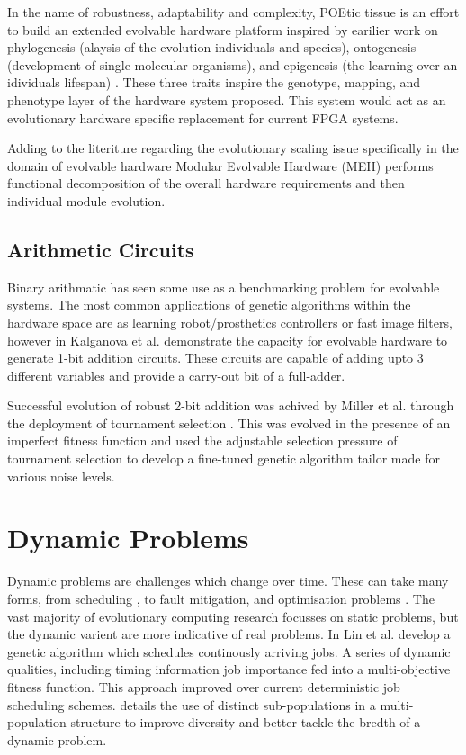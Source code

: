 In the name of robustness, adaptability and complexity, POEtic tissue
\cite{Tyrrell:2003:PTI:1766731.1766747} is
an effort to build an extended evolvable hardware platform inspired by
earilier work on phylogenesis (alaysis of the evolution individuals and species),
ontogenesis (development of single-molecular organisms), and epigenesis
(the learning over an idividuals lifespan) \cite{10.1007/3-540-63173-9_37}.
These three traits inspire the genotype, mapping, and phenotype layer of the
hardware system proposed. This system would act as an evolutionary hardware
specific replacement for current FPGA systems.

Adding to the literiture regarding the evolutionary scaling issue specifically
in the domain of evolvable hardware
Modular Evolvable Hardware (MEH) \cite{1299561} performs functional decomposition
of the overall hardware requirements and then individual module evolution.

\subsection{Arithmetic Circuits}

Binary arithmatic has seen some use as a benchmarking problem for evolvable systems.
The most common applications of genetic algorithms within the hardware space
are as learning robot/prosthetics controllers or fast image filters, however
in \cite{Miller_multiple-valuedcombinational} Kalganova et al. demonstrate the
capacity for evolvable hardware to generate 1-bit addition circuits. These
circuits are capable of adding upto 3 different variables and provide a carry-out
bit of a full-adder.

Successful evolution of robust 2-bit addition was achived by Miller et al. through
the deployment of tournament selection \cite{TournamentAdder}. This was evolved
in the presence of an imperfect fitness function and used the adjustable selection
pressure of tournament selection to develop a fine-tuned genetic algorithm tailor
made for various noise levels.

\section{Dynamic Problems}

Dynamic problems are challenges which change over time. These can take many
forms, from scheduling \cite{LIN1997AGA}, to fault mitigation, and optimisation problems
\cite{Branke2003}. The vast majority of evolutionary computing research focusses on
static problems, but the dynamic varient are more indicative of real problems.
In \cite{LIN1997AGA} Lin et al. develop a genetic algorithm
which schedules continously arriving jobs. A series of dynamic qualities, including
timing information job importance fed into a multi-objective fitness function. This
approach improved over current deterministic job scheduling schemes. \cite{Branke2003}
details the use of distinct sub-populations in a multi-population structure to
improve diversity and better tackle the bredth of a dynamic problem.

